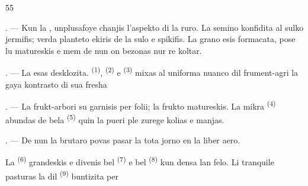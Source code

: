 \begin{VUpage}[57]{55}
\VUsaut{5.0mm}
\VUsaut{3.0mm}
\VUsaut{3.0mm}
\VUsaut{4.0mm}
\VUsaut{3.0mm}

. --- Kun la , unplusafoye chanjis\nl
l'aspekto di la ruro. La semino konfidita al\nl
sulko jermifis; verda planteto ekiris de la sulo\nl
e spikifis. La grano esis formacata, pose lu\nl
matureskis e mem de nun on bezonas nur re\cc
koltar.

. --- La  esas desklozita.  \textsuperscript{(1)},\nl
{} \textsuperscript{(2)} e  \textsuperscript{(3)} mixas al uniforma\nl
nuanco dil frument-agri la gaya kontrasto di\nl
sua fresha 

. --- La frukt-arbori su garnisis per folii;\nl
la frukto matureskis. La mikra  \textsuperscript{(4)}\nl
abundas de bela  \textsuperscript{(5)} quin la pueri ple\cc
zurege kolias e manjas.

. --- De nun la brutaro povas pasar la tota\nl
jorno en la liber aero.

\VUblancAlinea
La  \textsuperscript{(6)} grandeskis e divenis bel\nl
{} \textsuperscript{(7)} e bel  \textsuperscript{(8)} kun densa lan\cc
felo. Li tranquile pasturas la  dil \cc
{} \textsuperscript{(9)} buntizita per 
\end{VUpage}

